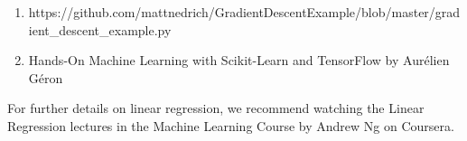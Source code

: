 \documentclass[11pt]{article}
\providecommand{\tightlist}{%
      \setlength{\itemsep}{0pt}\setlength{\parskip}{0pt}}
\begin{document}
\begin{enumerate}
\def\labelenumi{\arabic{enumi}.}
\tightlist
\item
  https://github.com/mattnedrich/GradientDescentExample/blob/master/gradient\_descent\_example.py
\item
  Hands-On Machine Learning with Scikit-Learn and TensorFlow by Aurélien
  Géron
\end{enumerate}

For further details on linear regression, we recommend watching the
Linear Regression lectures in the Machine Learning Course by Andrew Ng
on Coursera.


    
    
    
    
\end{document}
